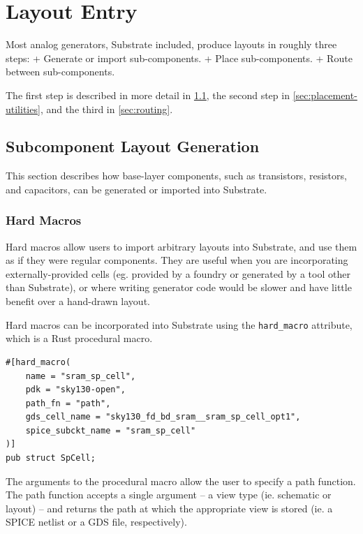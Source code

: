\section{Layout Entry} \label{sec:layout-entry}

Most analog generators, Substrate included, produce layouts in roughly three steps:
+ Generate or import sub-components.
+ Place sub-components.
+ Route between sub-components.

The first step is described in more detail in \ref{sec:subcomponent-layout-generation},
the second step in \ref{sec:placement-utilities}, and the third in \ref{sec:routing}.

\subsection{Subcomponent Layout Generation} \label{sec:subcomponent-layout-generation}

This section describes how base-layer components, such as transistors, resistors, and capacitors, can be generated or imported into Substrate.

\subsubsection{Hard Macros} \label{sec:hard-macros}
Hard macros allow users to import arbitrary layouts into Substrate, and use them as if they were regular components. They are useful when you are incorporating externally-provided cells (eg. provided by a foundry or generated by a tool other than Substrate), or where writing generator code would be slower and have little benefit over a hand-drawn layout.

Hard macros can be incorporated into Substrate using the \verb|hard_macro| attribute, which is a Rust procedural macro.

\begin{verbatim}
#[hard_macro(
    name = "sram_sp_cell",
    pdk = "sky130-open",
    path_fn = "path",
    gds_cell_name = "sky130_fd_bd_sram__sram_sp_cell_opt1",
    spice_subckt_name = "sram_sp_cell"
)]
pub struct SpCell;
\end{verbatim}

The arguments to the procedural macro allow the user to specify a path function. The path function accepts a single argument – a view type (ie. schematic or layout) – and returns the path at which the appropriate view is stored (ie. a SPICE netlist or a GDS file, respectively).

